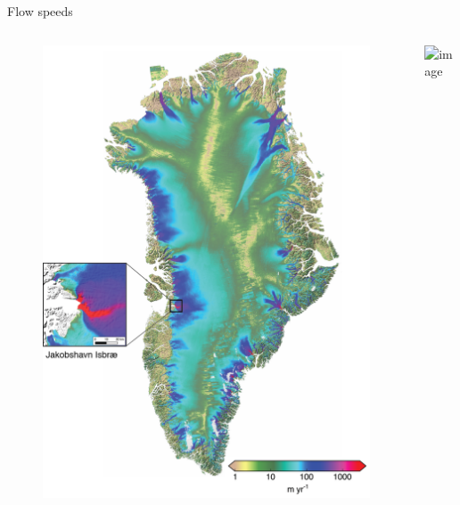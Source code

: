 \documentclass[hide notes,intlimits]{beamer}
\begin{document}
{
%
} 

\begin{frame}{Flow speeds}
\vspace{-0.74em}
  \begin{columns}
    \column[c]{5cm}
    \begin{figure}
      \includegraphics[width=\textwidth]{greenland-obs-overview}
    \end{figure}
    \column[c]{5cm}
    \includegraphics<1>[width=\textwidth]{jakobshavn-obs-nogate}
  \end{columns}
\end{frame}
\end{document}
